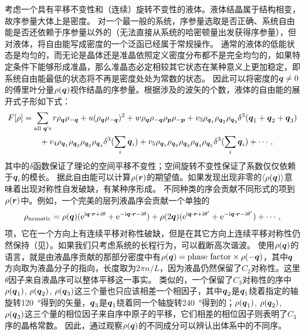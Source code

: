 \documentclass[hyperref, UTF8, a4paper]{ctexart}
\newcommand*{\ii}{\mathrm{i}}
\newcommand*{\ee}{\mathrm{e}}
\begin{document}
考虑一个具有平移不变性和（连续）旋转不变性的液体。液体结晶属于结构相变，故序参量大体上是密度。
对一个最一般的系统，序参量选取是否正确、系统自由能是否还依赖于序参量以外的（无法直接从系统的哈密顿量出发获得序参量），但对液体，将自由能写成密度的一个泛函已经属于常规操作\cite{Evans_2016,cdft2020}。
通常的液体的低能状态是均匀的，而无论是晶体还是准晶依照定义密度分布都不是完全均匀的，如果特定条件下能够形成准晶，那么准晶态必定相较其它状态在某种意义上更加稳定，即系统自由能最低的状态将不再是密度处处为常数的状态。
因此可以将密度的$\vb*{q} \neq 0$的傅里叶分量$\rho(\vb*{q})$视作结晶的序参量。根据涉及的波矢的个数，液体的自由能的展开式子形如下式：
\begin{equation}
    \begin{aligned}
        F[\rho] &= \sum_\text{all $\vb*{q}$'s} r \rho_{\vb*{q}} \rho_{- \vb*{q}} + u (\rho_{\vb*{q}} \rho_{- \vb*{q}})^2 
        + w \rho_{\vb*{q}} \rho_{- \vb*{q}} \rho_{\vb*{p}} \rho_{- \vb*{p}} 
        + v_3 \rho_{\vb*{q}_1} \rho_{\vb*{q}_2} \rho_{\vb*{q}_3} \delta^3(\vb*{q}_1 + \vb*{q}_2 + \vb*{q}_3) \\
        &\quad \quad + v_4 \rho_{\vb*{q}_1} \rho_{\vb*{q}_2} \rho_{\vb*{q}_3} \rho_{\vb*{q}_4} \delta^3(\sum_i \vb*{q}_i) 
        + v_5 \rho_{\vb*{q}_1} \rho_{\vb*{q}_2} \rho_{\vb*{q}_3} \rho_{\vb*{q}_4} \rho_{\vb*{q}_5}
        \delta^3(\sum_i \vb*{q}_i) + \cdots,
    \end{aligned}
    \label{eq:free-energy-static}
\end{equation}
其中的$\delta$函数保证了理论的空间平移不变性；空间旋转不变性保证了系数仅仅依赖于$\vb*{q}_i$的模长。
据此自由能可以计算$\rho(\vb*{r})$的期望值。如果发现出现非零的$\expval{\rho(\vb*{q})}$意味着出现对称性自发破缺，有某种序形成。
不同种类的序会贡献不同形式的项到$\rho(\vb*{r})$中。例如，一个完美的层列液晶序会贡献一个单独的
\begin{equation}
    \rho_\text{nematic} = \rho(\vb*{q}) (\ee^{\ii \vb*{q} \cdot \vb*{r} + \ii \theta } + \ee^{- \ii \vb*{q} \cdot \vb*{r} - \ii \theta } ) + \rho(2\vb*{q}) (\ee^{\ii \vb*{q} \cdot \vb*{r} + \ii \theta' } + \ee^{- \ii \vb*{q} \cdot \vb*{r} - \ii \theta' } ) + \cdots,
\end{equation}
项，它在一个方向上有连续平移对称性破缺，但是在其它方向上连续平移对称性仍然保持（见）。如果我们只考虑系统的长程行为，可以截断高次谐波。
使用$\rho(\vb*{q})$的语言，就是由液晶序贡献的那部分密度中有$\rho(\vb*{q}) = \text{phase factor} \times \rho(-\vb*{q})$，其中$\vb*{q}$方向取为液晶分子的指向，长度取为$2\pi n/ L$，因为液晶仍然保留了$C_2$对称性。这里$\theta$因子来自液晶序可以整体平移这一事实。
类似的，一个保留了$C_3$对称性的序中$\rho(\vb*{q}_1)$, $\rho(\vb*{q}_2)$, $\rho(\vb*{q}_3)$这三个量也只应该相差一个相因子，其中$\vb*{q}_2$是$\vb*{q}_1$绕着指定的轴旋转\SI{120}{\degree}得到的矢量，$\vb*{q}_3$是$\vb*{q}_1$绕着同一个轴旋转\SI{240}{\degree}得到的；$\rho(\vb*{q}_1)$, $\rho(\vb*{q}_2)$, $\rho(\vb*{q}_3)$这三个量的相位因子来自序中原子的平移，它们相差的相位因子则表明了$C_3$序的晶格常数。
因此，通过观察$\rho(\vb*{q})$的不同成分可以辨认出体系中的不同序。
\end{document}

